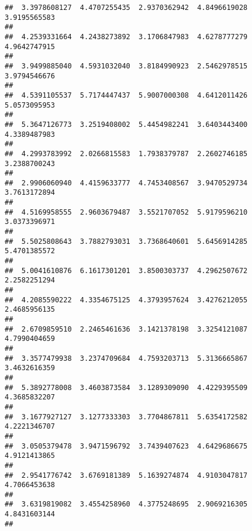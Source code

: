 \documentclass[]{article}
\begin{document}
\begin{verbatim}
##  3.3978608127  4.4707255435  2.9370362942  4.8496619028  3.9195565583 
##                                                                       
##  4.2539331664  4.2438273892  3.1706847983  4.6278777279  4.9642747915 
##                                                                       
##  3.9499885040  4.5931032040  3.8184990923  2.5462978515  3.9794546676 
##                                                                       
##  4.5391105537  5.7174447437  5.9007000308  4.6412011426  5.0573095953 
##                                                                       
##  5.3647126773  3.2519408002  5.4454982241  3.6403443400  4.3389487983 
##                                                                       
##  4.2993783992  2.0266815583  1.7938379787  2.2602746185  3.2388700243 
##                                                                       
##  2.9906060940  4.4159633777  4.7453408567  3.9470529734  3.7613172894 
##                                                                       
##  4.5169958555  2.9603679487  3.5521707052  5.9179596210  3.0373396971 
##                                                                       
##  5.5025808643  3.7882793031  3.7368640601  5.6456914285  5.4701385572 
##                                                                       
##  5.0041610876  6.1617301201  3.8500303737  4.2962507672  2.2582251294 
##                                                                       
##  4.2085590222  4.3354675125  4.3793957624  3.4276212055  2.4685956135 
##                                                                       
##  2.6709859510  2.2465461636  3.1421378198  3.3254121087  4.7990404659 
##                                                                       
##  3.3577479938  3.2374709684  4.7593203713  5.3136665867  3.4632616359 
##                                                                       
##  5.3892778008  3.4603873584  3.1289309090  4.4229395509  4.3685832207 
##                                                                       
##  3.1677927127  3.1277333303  3.7704867811  5.6354172582  4.2221346707 
##                                                                       
##  3.0505379478  3.9471596792  3.7439407623  4.6429686675  4.9121413865 
##                                                                       
##  2.9541776742  3.6769181389  5.1639274874  4.9103047817  4.7066453638 
##                                                                       
##  3.6319819082  3.4554258960  4.3775248695  2.9069216305  4.8431603144 
##                                                                       

\end{verbatim}
\end{document}
